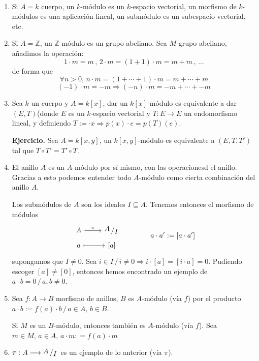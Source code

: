 \begin{ejems} \,  \vspace{-3mm}
    \begin{enumerate}
        \item Si $A=k$ cuerpo, un $k$-m\'odulo es un $k$-espacio vectorial, un morfismo de $k$-m\'odulos es una aplicaci\'on lineal, un subm\'odulo es un subespacio vectorial, etc.
        \item Si $A = \mathbb Z$, un $\mathbb Z$-m\'odulo es un grupo abeliano. Sea $M$ grupo abeliano, añadimos la operaci\'on:
        $$1\cdot m=m \,, \, 2\cdot m = (1+1)\cdot m = m+ m \, , \, \ldots$$
         de forma que
         $$\forall n > 0, \, n \cdot m = (1+\cdots+1)\cdot m = m + \cdots + m $$ $$ (-1) \cdot m = -m \Rightarrow (-n) \cdot m = - m+ \cdots + -m$$
         \item Sea $k$ un cuerpo y $A = k[x]$, dar un $k[x]$-m\'odulo es equivalente a dar $(E, T)$(donde $E$ es un $k$-espacio vectorial y $T:E \longrightarrow E$ un endomorfismo lineal, y definiendo $T := \cdot x \Rightarrow p(x) \cdot e = p(T)(e)$.
         
         \textbf{Ejercicio.} Sea $A=k[x,y]$, un $k[x,y]$-m\'odulo es equivalente a $(E,T,T')$ tal que $T \circ T' = T' \circ T$.
         \item El anillo $A$ es un $A$-m\'odulo por s\'i mismo, con las operacionesd el anillo. Gracias a esto podemos entender todo $A$-m\'odulo como cierta combinaci\'on del anillo $A$. 

         Los subm\'odulos de $A$ son los ideales $I \subseteq A$. Tenemos entonces el morfismo de m\'odulos
         $$\bt 
         A \arrow{r}{\pi} & \modulo{A}{I} \\[-5mm] 
         a \arrow[mapsto]{r} & \left[a\right]
         \et \qquad \qquad a \cdot a' := [a\cdot a']$$
         supongamos que $I\neq 0$. Sea $i \in I \, / \, i\neq 0 \Rightarrow i \cdot [a] = [i\cdot a] = 0$. Pudiendo escoger $[a]\neq [0]$, entonces hemos encontrado un ejemplo de $a\cdot b=0 \, / \, a,b \neq 0$. 
         \item Sea $f: A \longrightarrow B$ morfismo de anillos, $B$ es $A$-m\'odulo (v\'ia $f$) por el producto $a\cdot b := f(a) \cdot b\, / \, a\in A, \, b \in B$. 

         Si $M$ es un $B$-m\'odulo, entonces tambi\'en es $A$-m\'odulo (v\'ia $f$). Sea $m \in M, \, a \in A$, $a\cdot m : = f(a) \cdot m$
         \item $\pi :  A \longrightarrow \modulo{A}{I}$ es un ejemplo de lo anterior (v\'ia $\pi$).
    \end{enumerate}
\end{ejems}
